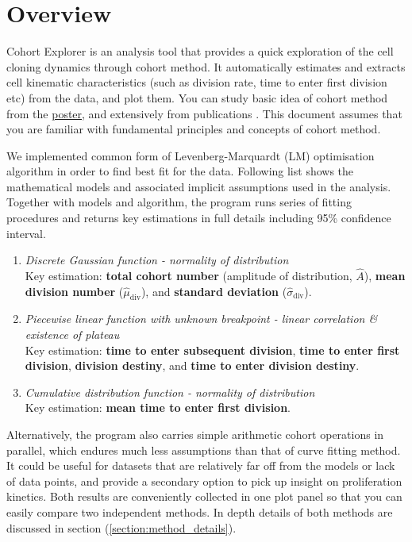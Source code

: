 \documentclass{article}
\newcommand{\enterProblemHeader}[1]{
}
\newcommand{\exitProblemHeader}[1]{
}
\newcounter{homeworkProblemCounter} %
\newcommand{\homeworkProblemName}{}
\newenvironment{homeworkProblem}[1][Problem \arabic{homeworkProblemCounter}]{ %
\stepcounter{homeworkProblemCounter} %
\renewcommand{\homeworkProblemName}{#1} %
\section{\homeworkProblemName} %
\enterProblemHeader{\homeworkProblemName} %
}{
\exitProblemHeader{\homeworkProblemName} %
}
\newcommand{\A}{\hat{A}}
\newcommand{\MU}{\hat{\mu}}
\newcommand{\SIGMA}{\hat{\sigma}}
\begin{document}
\begin{homeworkProblem}[Overview]
Cohort Explorer is an analysis tool that provides a quick exploration of the cell cloning dynamics through cohort method. It automatically estimates and extracts cell kinematic characteristics (such as division rate, time to enter first division etc) from the data, and plot them. You can study basic idea of cohort method from the \href{https://github.com/hodgkinlab/cohort-method/blob/master/documents/Kan_cohort_poster.pdf}{poster}, and extensively from publications \cite{Gett, Hawkins, Marchingo}. This document assumes that you are familiar with fundamental principles and concepts of cohort method.

We implemented common form of Levenberg-Marquardt (LM) optimisation algorithm in order to find best fit for the data. Following list shows the mathematical models and associated implicit assumptions used in the analysis. Together with models and algorithm, the program runs series of fitting procedures and returns key estimations in full details including 95\% confidence interval.
\begin{enumerate}
    \item \textit{Discrete Gaussian function - normality of distribution} \\ Key estimation: \textbf{total cohort number} (amplitude of distribution, $\A$), \textbf{mean division number} ($\MU_{\mathrm{div}}$), and \textbf{standard deviation} ($\SIGMA_{\mathrm{div}}$).
    \item \textit{Piecewise linear function with unknown breakpoint - linear correlation \& existence of plateau} \\ Key estimation: \textbf{time to enter subsequent division}, \textbf{time to enter first division}, \textbf{division destiny}, and \textbf{time to enter division destiny}.
    \item \textit{Cumulative distribution function - normality of distribution} \\ Key estimation: \textbf{mean time to enter first division}.
\end{enumerate}
Alternatively, the program also carries simple arithmetic cohort operations in parallel, which endures much less assumptions than that of curve fitting method. It could be useful for datasets that are relatively far off from the models or lack of data points, and provide a secondary option to pick up insight on proliferation kinetics. Both results are conveniently collected in one plot panel so that you can easily compare two independent methods. In depth details of both methods are discussed in section (\ref{section:method_details}).
\end{homeworkProblem}
\end{document}
